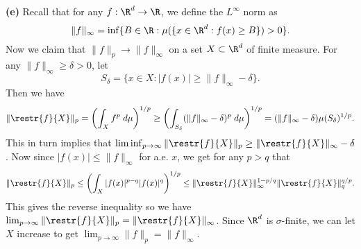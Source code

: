 \documentclass[11pt,letterpaper]{article}
\begin{document}
\begin{solution}
    \textbf{(e)} Recall that for any $f : \R^d \to \R$, we define the $L^\infty$ norm as
    \[
        \|f\|_\infty = \inf \{B\in \R : \mu(\{x\in \R^d : f(x)\geq B\}) > 0\}
    .\] 
    Now we claim that $\|f\|_p \to \|f\|_\infty$ on a set $X\subset \R^d$ of finite measure. For any $\|f\|_\infty \geq \delta > 0$, let \[S_\delta = \{x\in X : |f(x)|\geq \|f\|_\infty -\delta\}.\]
    Then we have
    \[
        \|\restr{f}{X}\|_p= \left(\int_X f^p\;d\mu\right)^{1 /p} \geq \left(\int_{S_\delta} (\|f\|_\infty - \delta)^p\;d\mu\right)^{1 /p}=(\|f\|_\infty - \delta)\mu(S_\delta)^{1 /p}
    .\]  
    This in turn implies that $\liminf_{p\to \infty} \|\restr{f}{X}\|_p \geq \|\restr{f}{X}\|_\infty-\delta$. Now since $|f(x)|\leq \|f\|_\infty$ for a.e. $x$, we get for any $p>q$ that
    \[
        \|\restr{f}{X}\|_p \leq \left(\int_X |f(x)|^{p-q}|f(x)|^q\right)^{1/p}\leq \|\restr{f}{X}\|^{1-p /q}_\infty \|\restr{f}{X}\|_q^{q /p} 
    .\]  
    This gives the reverse inequality so we have $\lim_{p\to \infty} \|\restr{f}{X}\|_p =\|\restr{f}{X}\|_\infty$. Since $\R^d$ is $\sigma$-finite, we can let $X$ increase to get $\lim_{p\to \infty}\|f\|_p = \|f\|_\infty$. 
\end{solution}
\end{document}
